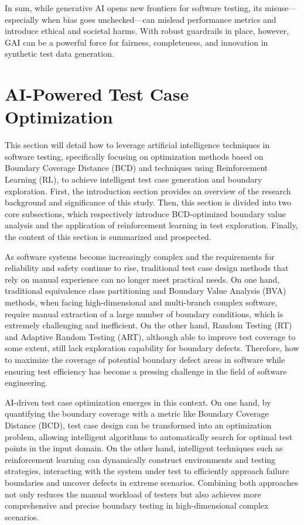 \documentclass[manuscript,screen,review]{acmart}
\begin{document}
In sum, while generative AI opens new frontiers for software testing, its misuse---especially when bias goes unchecked---can mislead performance metrics and introduce ethical and societal harms. With robust guardrails in place, however, GAI can be a powerful force for fairness, completeness, and innovation in synthetic test data generation.




\section{AI-Powered Test Case Optimization}
\label{sec:3}

This section will detail how to leverage artificial intelligence techniques in software testing, specifically focusing on optimization methods based on Boundary Coverage Distance (BCD) and techniques using Reinforcement Learning (RL), to achieve intelligent test case generation and boundary exploration. First, the introduction section provides an overview of the research background and significance of this study. Then, this section is divided into two core subsections, which respectively introduce BCD-optimized boundary value analysis and the application of reinforcement learning in test exploration. Finally, the content of this section is summarized and prospected.

As software systems become increasingly complex and the requirements for reliability and safety continue to rise, traditional test case design methods that rely on manual experience can no longer meet practical needs. On one hand, traditional equivalence class partitioning and Boundary Value Analysis (BVA) methods, when facing high-dimensional and multi-branch complex software, require manual extraction of a large number of boundary conditions, which is extremely challenging and inefficient. On the other hand, Random Testing (RT) and Adaptive Random Testing (ART), although able to improve test coverage to some extent, still lack exploration capability for boundary defects. Therefore, how to maximize the coverage of potential boundary defect areas in software while ensuring test efficiency has become a pressing challenge in the field of software engineering.

AI-driven test case optimization emerges in this context. On one hand, by quantifying the boundary coverage with a metric like Boundary Coverage Distance (BCD), test case design can be transformed into an optimization problem, allowing intelligent algorithms to automatically search for optimal test points in the input domain. On the other hand, intelligent techniques such as reinforcement learning can dynamically construct environments and testing strategies, interacting with the system under test to efficiently approach failure boundaries and uncover defects in extreme scenarios. Combining both approaches not only reduces the manual workload of testers but also achieves more comprehensive and precise boundary testing in high-dimensional complex scenarios.
\end{document}
